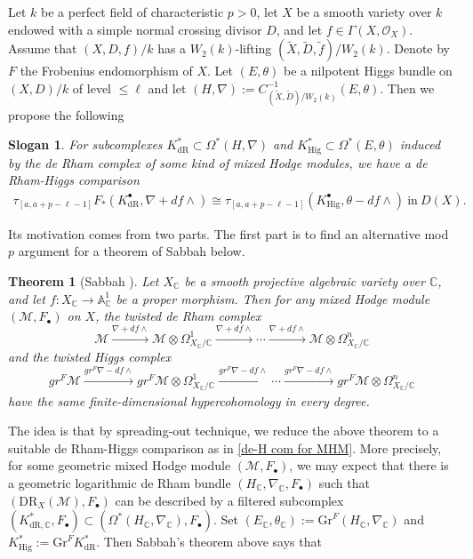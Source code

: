 \documentclass[12pt, a4paper]{article}
\newtheorem{theorem}{Theorem}[section]
\newtheorem{slogan}{Slogan}[section]
\begin{document}
\iffalse
Let $k$ be a perfect field of characteristic $p>0$, let $X$ be a smooth variety over $k$ endowed with a simple normal crossing divisor $D$, and let $f\in\Gamma(X,\mathcal O_X)$. Assume that $(X,D,f)/k$ has a $W_2(k)$-lifting $(\tilde X,\tilde D,\tilde f)/W_2(k)$. Denote by $F$ the Frobenius endomorphism of $X$. Let $(E,\theta)$ be a nilpotent Higgs bundle on $(X,D)/k$ of level $\leq\ell$ and let $(H,\nabla):=C^{-1}_{(\tilde X,\tilde D)/W_2(k)}(E,\theta)$. Then we propose the following
\begin{slogan}\label{slogan}
For subcomplexes $K^*_\mathrm{dR}\subset\Omega^*(H,\nabla)$ and $K^*_\mathrm{Hig}\subset\Omega^*(E,\theta)$ induced by the de Rham complex of some kind of mixed Hodge modules, we have a de Rham-Higgs comparison 
\begin{eqnarray}\label{de-H com for MHM}
\tau_{[a,a+p-\ell-1]}F_*(K^\bullet_\mathrm{dR},\nabla+df\wedge)\cong\tau_{[a,a+p-\ell-1]}(K^\bullet_\mathrm{Hig},\theta-df\wedge)~\mathrm{in}~D(X).
\end{eqnarray}
\end{slogan}
Its motivation comes from two parts. The first part is to find an alternative mod $p$ argument for a theorem of Sabbah below.
\begin{theorem}[Sabbah \cite{Sah1}]\label{Sabbah's theorem}
Let $X_\mathbb{C}$ be a smooth projective algebraic variety over $\mathbb C$, and let $f:X_\mathbb{C}\to\mathbb A^1_\mathbb{C}$ be a proper morphism. Then for any mixed Hodge module $(\mathcal M,F_\bullet)$ on $X$, the twisted de Rham complex 
$$
\mathcal M\xrightarrow{\nabla+df\wedge}\mathcal M\otimes\Omega^1_{X_\mathbb{C}/\mathbb C}\xrightarrow{\nabla+df\wedge}\cdots\xrightarrow{\nabla+df\wedge}\mathcal M\otimes\Omega^n_{X_\mathbb{C}/\mathbb C}
$$
and the twisted Higgs complex 
$$
gr^F\mathcal M\xrightarrow[]{gr^F\nabla-df\wedge}gr^F\mathcal M\otimes\Omega^1_{X_\mathbb{C}/\mathbb C}\xrightarrow[]{gr^F\nabla-df\wedge}\cdots\xrightarrow[]{gr^F\nabla-df\wedge}gr^F\mathcal M\otimes\Omega^n_{X_\mathbb{C}/\mathbb C}
$$
have the same finite-dimensional hypercohomology in every degree.
\end{theorem}
 The idea is that by spreading-out technique, we reduce the above theorem to a suitable de Rham-Higgs comparison as in \eqref{de-H com for MHM}. More precisely, for some geometric mixed Hodge module $(\mathcal M,F_\bullet)$, we may expect that there is a geometric logarithmic de Rham bundle $(H_\mathbb{C},\nabla_\mathbb{C},F_\bullet)$ such that $(\mathrm{DR}_X(\mathcal M),F_\bullet)$ can be described by a filtered subcomplex $(K^*_{\mathrm{dR},\mathbb C},F_\bullet)\subset(\Omega^*(H_\mathbb{C},\nabla_\mathbb{C}),F_\bullet)$. Set $(E_\mathbb{C},\theta_\mathbb{C}):=\mathrm{Gr}^F(H_\mathbb{C},\nabla_\mathbb{C})$ and $K^*_\mathrm{Hig}:=\mathrm{Gr}^FK^*_\mathrm{dR}$. Then Sabbah's theorem above says that 
\end{document}
